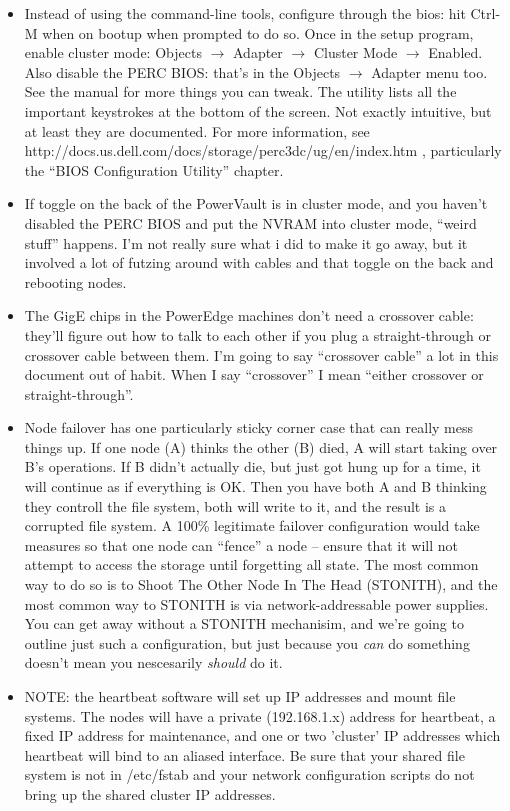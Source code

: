 \documentclass[11pt]{article}
\begin{document}
\begin{itemize}
\item Instead of using the command-line tools, configure through the
  bios: hit Ctrl-M when on bootup when prompted to do so.  Once in the
  setup program, enable cluster mode:
  Objects $\rightarrow$ Adapter $\rightarrow$ Cluster Mode $\rightarrow$
  Enabled.  Also disable the PERC BIOS: that's in the Objects
  $\rightarrow$ Adapter menu too.  See the manual for more things you
  can tweak.  The utility lists all the important keystrokes at the
  bottom of the screen.  Not exactly intuitive, but at least they are
  documented. For more information, see
  http://docs.us.dell.com/docs/storage/perc3dc/ug/en/index.htm ,
  particularly the ``BIOS Configuration Utility'' chapter.

\item If toggle on the back of the PowerVault is in cluster mode, and you
  haven't disabled the PERC BIOS and put the NVRAM into cluster mode,
  ``weird stuff'' happens.   I'm not really sure what i did to make it go
  away, but it involved a lot of futzing around with cables and that
  toggle on the back and rebooting nodes. 

\item The GigE chips in the PowerEdge machines don't need a crossover cable:
  they'll figure out how to talk to each other if you plug a
  straight-through or crossover cable between them.  I'm going to say
  ``crossover cable'' a lot in this document out of habit.  When I say
  ``crossover'' I mean ``either crossover or straight-through''.

\item Node failover has one particularly sticky corner case that can
  really mess things up.  If one node (A) thinks the other (B) died, A
  will start taking over B's operations.  If B didn't actually die, but
  just got hung up for a time, it will continue as if everything is OK.
  Then you have both A and B thinking they controll the file system,
  both will write to it, and the result is a corrupted file system. A
  100\% legitimate failover configuration would take measures so that
  one node can ``fence'' a node -- ensure that it will not attempt to
  access the storage until forgetting all state.  The most common way to
  do so is to Shoot The Other Node In The Head (STONITH), and the most
  common way to STONITH is via network-addressable power supplies.  You
  can get away without a STONITH mechanisim, and we're going to outline
  just such a configuration, but just because you { \em can} do something
  doesn't mean you nescesarily {\em should} do it.  

\item NOTE: the heartbeat software will set up IP addresses and mount file
  systems.  The nodes will have a private (192.168.1.x) address for
  heartbeat, a fixed IP address for maintenance, and one or two
  'cluster' IP addresses which heartbeat will bind to an aliased
  interface.  Be sure that your shared file system is not in /etc/fstab
  and your network configuration scripts do not bring up the shared
  cluster IP addresses.  
\end{itemize}
\end{document}
